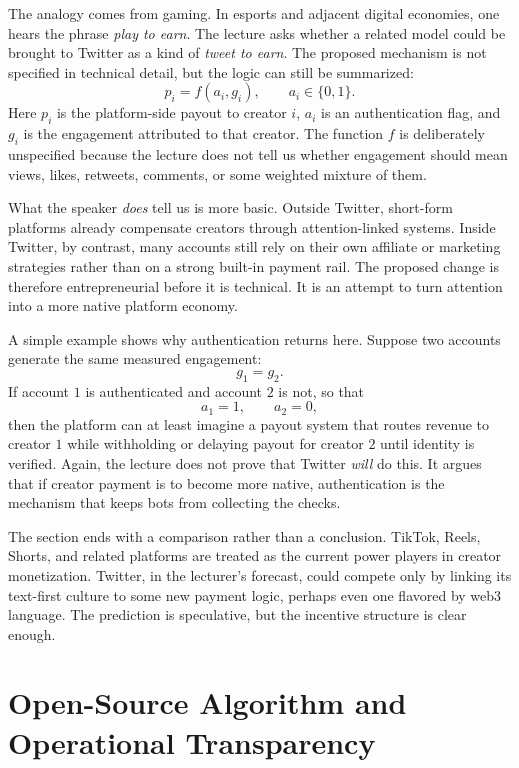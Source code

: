 The analogy comes from gaming. In esports and adjacent digital economies, one hears the phrase \emph{play to earn}. The lecture asks whether a related model could be brought to Twitter as a kind of \emph{tweet to earn}. The proposed mechanism is not specified in technical detail, but the logic can still be summarized:
\begin{equation}
p_i = f(a_i, g_i),
\qquad
a_i \in \{0,1\}.
\end{equation}
Here \(p_i\) is the platform-side payout to creator \(i\), \(a_i\) is an authentication flag, and \(g_i\) is the engagement attributed to that creator. The function \(f\) is deliberately unspecified because the lecture does not tell us whether engagement should mean views, likes, retweets, comments, or some weighted mixture of them.

What the speaker \emph{does} tell us is more basic. Outside Twitter, short-form platforms already compensate creators through attention-linked systems. Inside Twitter, by contrast, many accounts still rely on their own affiliate or marketing strategies rather than on a strong built-in payment rail. The proposed change is therefore entrepreneurial before it is technical. It is an attempt to turn attention into a more native platform economy.

A simple example shows why authentication returns here. Suppose two accounts generate the same measured engagement:
\[
g_1 = g_2.
\]
If account \(1\) is authenticated and account \(2\) is not, so that
\[
a_1 = 1,\qquad a_2 = 0,
\]
then the platform can at least imagine a payout system that routes revenue to creator \(1\) while withholding or delaying payout for creator \(2\) until identity is verified. Again, the lecture does not prove that Twitter \emph{will} do this. It argues that if creator payment is to become more native, authentication is the mechanism that keeps bots from collecting the checks.

The section ends with a comparison rather than a conclusion. TikTok, Reels, Shorts, and related platforms are treated as the current power players in creator monetization. Twitter, in the lecturer's forecast, could compete only by linking its text-first culture to some new payment logic, perhaps even one flavored by web3 language. The prediction is speculative, but the incentive structure is clear enough.

\section{Open-Source Algorithm and Operational Transparency}

